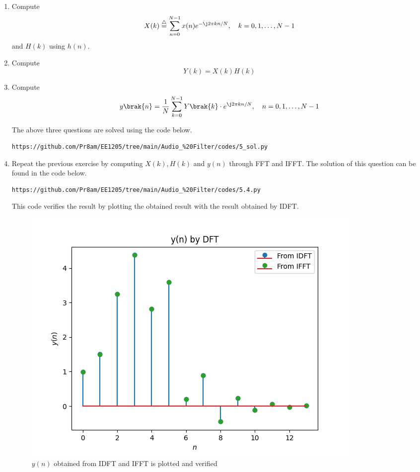 \documentclass[journal,12pt,twocolumn]{IEEEtran}
\newcommand{\define}{\stackrel{\triangle}{=}}
\theoremstyle{remark}
\begin{document}
\begin{enumerate}[label=\thesection.\arabic*]
\item
Compute
\begin{equation}
X(k) \define \sum _{n=0}^{N-1}x(n) e^{-\j2\pi kn/N}, \quad k = 0,1,\dots, N-1
\end{equation}
and $H(k)$ using $h(n)$.
\item Compute 
\begin{equation}
Y(k) = X(k)H(k)
\label{eq:fp}
\end{equation}
\item Compute
\begin{equation}
y\brak{n}={\frac {1}{N}}\sum _{k=0}^{N-1}Y\brak{k}\cdot e^{\j 2\pi kn/N},\quad n = 0,1,\dots, N-1
\label{eq:inv-ft}
\end{equation}

\solution The above three questions are solved using the code below.
\begin{lstlisting}
https://github.com/Pr8am/EE1205/tree/main/Audio_%20Filter/codes/5_sol.py
\end{lstlisting}

\item Repeat the previous exercise by computing $X(k), H(k)$ and $y(n)$ through FFT and IFFT.
\solution The solution of this question can be found in the code below.
\begin{lstlisting}
https://github.com/Pr8am/EE1205/tree/main/Audio_%20Filter/codes/5.4.py   
\end{lstlisting}
This code verifies the result by plotting the obtained result with the result obtained by IDFT.
\begin{figure}[H]
\centering
\includegraphics[width=\columnwidth]{figs/yn_verf_5.4.png}
\caption{$y(n)$ obtained from IDFT and IFFT is plotted and verified}
\label{fig:yn_verf_5.4}
\end{figure}


\end{enumerate}
\end{document}
